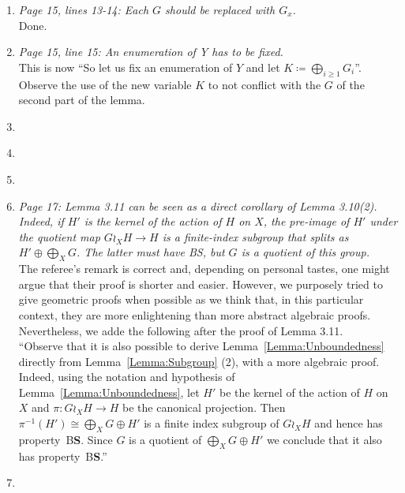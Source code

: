 \documentclass[english,a4paper]{article}
\newcommand*{\BS}{B\textbf{S}}
\begin{document}
\begin{enumerate}
%
\item\textit{Page 15, lines 13-14: Each $G$ should be replaced with $G_x$.}\\
Done.
%
\item\textit{Page 15, line 15: An enumeration of Y has to be fixed.}\\
This is now ``So let us fix an enumeration of $Y$ and let $K\coloneqq \bigoplus_{i\geq 1}G_i$''. Observe the use of the new variable $K$ to not conflict with the $G$ of the second part of the lemma.
%
\item\textit{}\\
%
\item\textit{}\\
%
\item\textit{}\\







%
\item\textit{Page 17: Lemma 3.11 can be seen as a direct corollary of Lemma 3.10(2). Indeed, if $H'$ is the kernel of the action of $H$ on $X$, the pre-image of $H'$ under the quotient map $G\wr_XH\to H$ is a finite-index subgroup that splits as $H'\oplus\bigoplus_XG$. The latter must have BS, but $G$ is a quotient of this group.}\\
The referee's remark is correct and, depending on personal tastes, one might argue that their proof is shorter and easier.
However, we purposely tried to give geometric proofs when possible as we think that, in this particular context, they are more enlightening than more abstract algebraic proofs.
Nevertheless, we adde the following after the proof of Lemma 3.11.\\
``Observe that it is also possible to derive Lemma~\ref{Lemma:Unboundedness} directly from Lemma~\ref{Lemma:Subgroup} (2), with a more algebraic proof.
Indeed, using the notation and hypothesis of Lemma~\ref{Lemma:Unboundedness}, let $H'$ be the kernel of the action of $H$ on $X$ and $\pi\colon G\wr_XH\to H$ be the canonical projection. Then $\pi^{-1}(H')\cong \bigoplus_XG\oplus H'$ is a finite index subgroup of $G\wr_XH$ and hence has property~\BS.
Since $G$ is a quotient of $\bigoplus_XG\oplus H'$ we conclude that it also has property~\BS.''
%
\item\textit{}\\










\end{enumerate}
\end{document}
